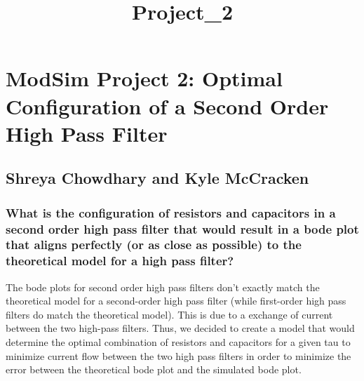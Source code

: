 \documentclass[11pt]{article}
\title{Project\_2}
\begin{document}
    
    
    \maketitle
    
    

    
    \hypertarget{modsim-project-2-optimal-configuration-of-a-second-order-high-pass-filter}{%
\section{ModSim Project 2: Optimal Configuration of a Second Order High
Pass
Filter}\label{modsim-project-2-optimal-configuration-of-a-second-order-high-pass-filter}}

\hypertarget{shreya-chowdhary-and-kyle-mccracken}{%
\subsection{Shreya Chowdhary and Kyle
McCracken}\label{shreya-chowdhary-and-kyle-mccracken}}

    \hypertarget{what-is-the-configuration-of-resistors-and-capacitors-in-a-second-order-high-pass-filter-that-would-result-in-a-bode-plot-that-aligns-perfectly-or-as-close-as-possible-to-the-theoretical-model-for-a-high-pass-filter}{%
\subsubsection{What is the configuration of resistors and capacitors in
a second order high pass filter that would result in a bode plot that
aligns perfectly (or as close as possible) to the theoretical model for
a high pass
filter?}\label{what-is-the-configuration-of-resistors-and-capacitors-in-a-second-order-high-pass-filter-that-would-result-in-a-bode-plot-that-aligns-perfectly-or-as-close-as-possible-to-the-theoretical-model-for-a-high-pass-filter}}

The bode plots for second order high pass filters don't exactly match
the theoretical model for a second-order high pass filter (while
first-order high pass filters do match the theoretical model). This is
due to a exchange of current between the two high-pass filters. Thus, we
decided to create a model that would determine the optimal combination
of resistors and capacitors for a given tau to minimize current flow
between the two high pass filters in order to minimize the error between
the theoretical bode plot and the simulated bode plot.
\end{document}
